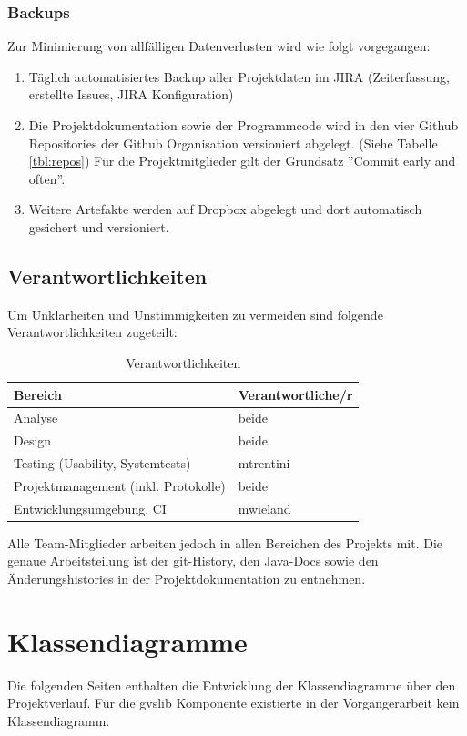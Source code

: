 \documentclass[11pt,a4paper,english,oneside]{book}
\numberwithin{equation}{chapter}
\begin{document}
	\subsection{Backups}
	\label{sec:backup}
	Zur Minimierung von allfälligen Datenverlusten wird wie folgt vorgegangen:
	
	\begin{enumerate}
		\item Täglich automatisiertes Backup aller Projektdaten im JIRA \cite{jira} (Zeiterfassung, erstellte Issues, JIRA Konfiguration)
		\item Die Projektdokumentation sowie der Programmcode wird in den vier Github Repositories der Github Organisation \cite{github} versioniert abgelegt. (Siehe Tabelle \ref{tbl:repos}) Für die Projektmitglieder gilt der Grundsatz ''Commit early and often''.
		\item Weitere Artefakte werden auf Dropbox \cite{dropbox} abgelegt und dort automatisch gesichert und versioniert.
	\end{enumerate}
	
	
	
	\section{Verantwortlichkeiten}
	Um Unklarheiten und Unstimmigkeiten zu vermeiden sind folgende Verantwortlichkeiten zugeteilt:
	
	\begin{table}[h!]
		\centering
		\begin{tabular}{l l}
			\toprule 
			Bereich & Verantwortliche/r \\
			\toprule 
			Analyse & beide \\
			Design & beide \\ 
			Testing (Usability, Systemtests) & mtrentini \\
			Projektmanagement (inkl. Protokolle) & beide \\
			Entwicklungsumgebung, CI & mwieland \\
			\bottomrule 
		\end{tabular} 
		\caption{Verantwortlichkeiten} 
	\end{table}
	
	\noindent
	Alle Team-Mitglieder arbeiten jedoch in allen Bereichen des Projekts mit. 
	Die genaue Arbeitsteilung ist der git-History, den Java-Docs sowie den Änderungshistories in der Projektdokumentation zu entnehmen.
	
	\chapter{Klassendiagramme} \label{ch:class-diagram}
	Die folgenden Seiten enthalten die Entwicklung der Klassendiagramme über den Projektverlauf. Für die \gls{gvslib} Komponente existierte in der Vorgängerarbeit kein Klassendiagramm.
	
\end{document}
